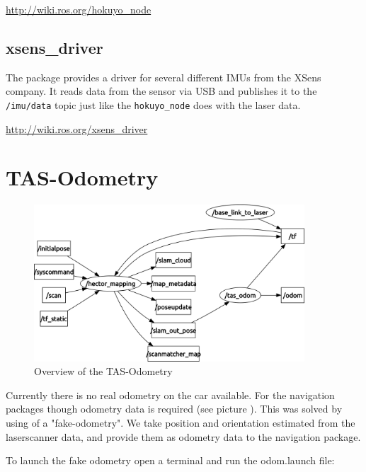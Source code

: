 {\hyperref[http://wiki.ros.org/hokuyo_node]{http://wiki.ros.org/hokuyo\_node}

\subsection{xsens\_driver}
\label{sec:tas_package_drivers_xsens}

The package provides a driver for several different IMUs from the XSens company. It reads data from the sensor via USB and publishes it to the \texttt{/imu/data} topic just like the \texttt{hokuyo\_node} does with the laser data.

\hyperref[http://wiki.ros.org/xsens_driver]{http://wiki.ros.org/xsens\_driver}

\newpage
\section{TAS-Odometry}
\label{sec:tas_package_odom}

\begin{figure}[h]
	\centering
		\includegraphics[width=0.9\textwidth]{diagrams/rqt_odom}
	\caption{Overview of the TAS-Odometry}
	\label{fig:rqt_odom}
\end{figure}

Currently there is no real odometry on the car available. For the navigation packages though odometry data is required (see picture ). This was solved by using of a "fake-odometry". We take position and orientation estimated from the laserscanner data, and provide them as odometry data to the navigation package. 

To launch the fake odometry open a terminal and run the odom.launch file:

 \\

}
